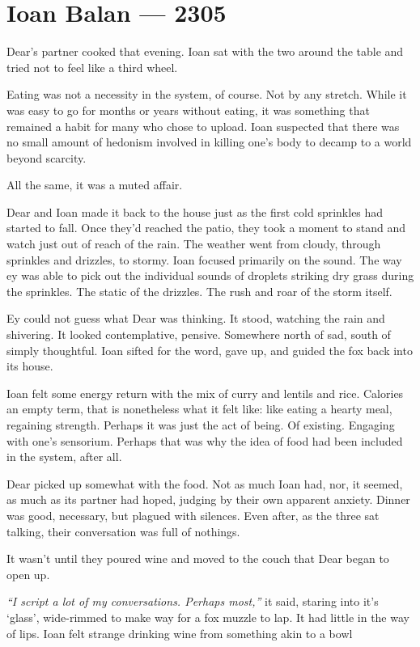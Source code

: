 \hypertarget{ioan-balan-2305}{%
\chapter*{Ioan Balan — 2305}\label{ioan-balan-2305}}

Dear's partner cooked that evening. Ioan sat with the two around the table and tried not to feel like a third wheel.

Eating was not a necessity in the system, of course. Not by any stretch. While it was easy to go for months or years without eating, it was something that remained a habit for many who chose to upload. Ioan suspected that there was no small amount of hedonism involved in killing one's body to decamp to a world beyond scarcity.

All the same, it was a muted affair.

Dear and Ioan made it back to the house just as the first cold sprinkles had started to fall. Once they'd reached the patio, they took a moment to stand and watch just out of reach of the rain. The weather went from cloudy, through sprinkles and drizzles, to stormy. Ioan focused primarily on the sound. The way ey was able to pick out the individual sounds of droplets striking dry grass during the sprinkles. The static of the drizzles. The rush and roar of the storm itself.

Ey could not guess what Dear was thinking. It stood, watching the rain and shivering. It looked contemplative, pensive. Somewhere north of sad, south of simply thoughtful. Ioan sifted for the word, gave up, and guided the fox back into its house.

Ioan felt some energy return with the mix of curry and lentils and rice. Calories an empty term, that is nonetheless what it felt like: like eating a hearty meal, regaining strength. Perhaps it was just the act of being. Of existing. Engaging with one's sensorium. Perhaps that was why the idea of food had been included in the system, after all.

Dear picked up somewhat with the food. Not as much Ioan had, nor, it seemed, as much as its partner had hoped, judging by their own apparent anxiety. Dinner was good, necessary, but plagued with silences. Even after, as the three sat talking, their conversation was full of nothings.

It wasn't until they poured wine and moved to the couch that Dear began to open up.

\emph{``I script a lot of my conversations. Perhaps most,''} it said, staring into it's `glass', wide-rimmed to make way for a fox muzzle to lap. It had little in the way of lips. Ioan felt strange drinking wine from something akin to a bowl

